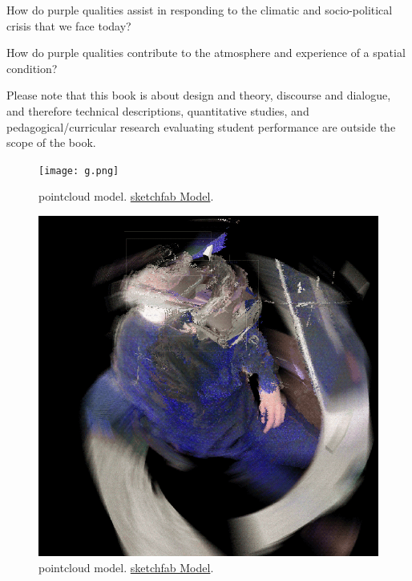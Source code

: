 \documentclass{article}
\newcommand\x{12.7}
\begin{document}
How do purple qualities assist in responding to the climatic and socio-political crisis that we face today?

How do purple qualities contribute to the atmosphere and experience of a spatial condition?


Please note that this book is about design and theory, discourse and dialogue, and therefore technical descriptions, quantitative studies, and pedagogical/curricular research evaluating student performance are outside the scope of the book.



\begin{figure}[H]
  \centering
  \captionsetup{font=small,justification=raggedright,singlelinecheck=false}
  \texttt{[image: g.png]}
  \caption{pointcloud model. \href{https://sketchfab.com/3d-models/wifi-workspace-visualisation-aefe16a1f9bd4296941e099754eaacc2}{sketchfab Model}.}
  \label{fig:method}
\end{figure}


\begin{figure}[H]
  \centering
  \captionsetup{font=small,justification=raggedright,singlelinecheck=false}
  \includegraphics[width=\x cm]{c.png}
  \caption{pointcloud model. \href{https://sketchfab.com/3d-models/wifi-workspace-visualisation-aefe16a1f9bd4296941e099754eaacc2}{sketchfab Model}.}
  \label{fig:method}
\end{figure}
\end{document}
